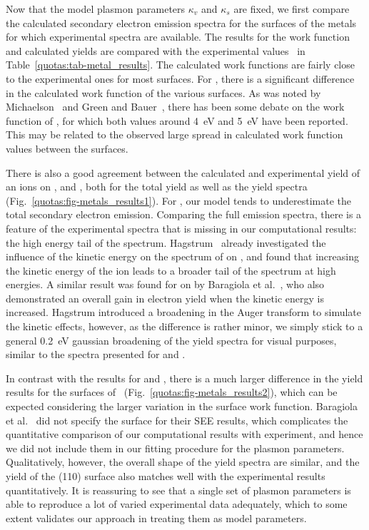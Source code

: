 \begin{refsection}
Now that the model plasmon parameters $\kappa_v$ and $\kappa_s$ are fixed, 
we first compare the calculated secondary electron emission spectra for the surfaces of 
the metals for which experimental spectra are available. The results for 
the work function and calculated yields are compared with the experimental 
values~\cite{DeWaele2016, Baragiola2001, Hagstrum1966} in 
Table~\ref{quotas:tab-metal_results}. The calculated work functions are fairly 
close to the experimental ones for most surfaces. For , there is a 
significant difference in the calculated work function of the various 
surfaces. As was noted by Michaelson~\cite{Michaelson1977} and Green and 
Bauer~\cite{Green1978}, there has been some debate on the work function of 
, for which both values around 4~\si{\electronvolt} and 5~\si{\electronvolt} have been 
reported. This may be related to the observed large spread in calculated work 
function values between the surfaces. 

There is also a good agreement between the calculated and experimental yield 
of  an  ions on ,  and , both for 
the total yield as well as the yield spectra 
(Fig.~\ref{quotas:fig-metals_results1}). For , our model tends to 
underestimate the total secondary electron emission. Comparing the full 
emission spectra, there is a feature of the experimental spectra that is 
missing in our computational results: the high energy tail of the spectrum. 
Hagstrum~\cite{Hagstrum1960} already investigated the influence of the kinetic 
energy on the spectrum of  on , and found that increasing 
the kinetic energy of the ion leads to a broader tail of the spectrum at high 
energies. A similar result was found for  on  by Baragiola et 
al.~\cite{Baragiola1996}, who also demonstrated an overall gain in electron 
yield when the kinetic energy is increased. Hagstrum introduced a broadening 
in the Auger transform to simulate the kinetic effects, however, as the 
difference is rather minor, we simply stick to a general 
0.2~\si{\electronvolt} gaussian broadening of the yield spectra for visual 
purposes, similar to the spectra presented for  and .

In contrast with the results for  and , there is a much larger 
difference in the yield results for the surfaces of 
~(Fig.~\ref{quotas:fig-metals_results2}), which can be expected 
considering the larger variation in the surface work function. Baragiola et 
al.~\cite{Baragiola2001} did not specify the  surface for their \gls{SEE} results, which 
complicates the quantitative comparison of our computational results with 
experiment, and hence we did not include them in our fitting procedure for the 
plasmon parameters. Qualitatively, however, the overall shape of the  
yield spectra are similar, and the yield of the (110) surface also matches 
well with the experimental results quantitatively. It is reassuring to see 
that a single set of plasmon parameters is able to reproduce a lot of varied 
experimental data adequately, which to some extent validates our approach in 
treating them as model parameters. 


\end{refsection}
